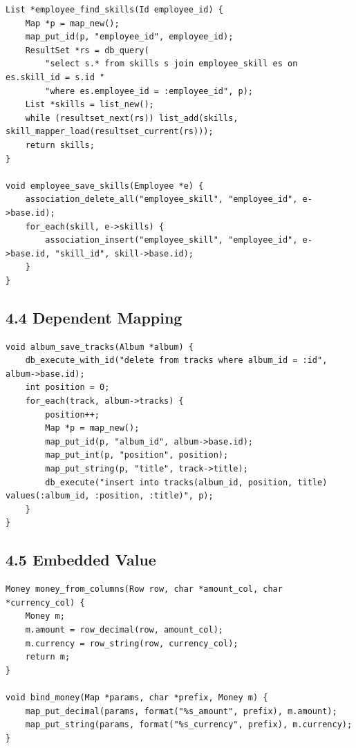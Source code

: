 \documentclass[11pt]{article}
\begin{document}
\begin{verbatim}
List *employee_find_skills(Id employee_id) {
    Map *p = map_new();
    map_put_id(p, "employee_id", employee_id);
    ResultSet *rs = db_query(
        "select s.* from skills s join employee_skill es on es.skill_id = s.id "
        "where es.employee_id = :employee_id", p);
    List *skills = list_new();
    while (resultset_next(rs)) list_add(skills, skill_mapper_load(resultset_current(rs)));
    return skills;
}

void employee_save_skills(Employee *e) {
    association_delete_all("employee_skill", "employee_id", e->base.id);
    for_each(skill, e->skills) {
        association_insert("employee_skill", "employee_id", e->base.id, "skill_id", skill->base.id);
    }
}
\end{verbatim}

\subsection{4.4 Dependent Mapping}\label{dependent-mapping}

\begin{verbatim}
void album_save_tracks(Album *album) {
    db_execute_with_id("delete from tracks where album_id = :id", album->base.id);
    int position = 0;
    for_each(track, album->tracks) {
        position++;
        Map *p = map_new();
        map_put_id(p, "album_id", album->base.id);
        map_put_int(p, "position", position);
        map_put_string(p, "title", track->title);
        db_execute("insert into tracks(album_id, position, title) values(:album_id, :position, :title)", p);
    }
}
\end{verbatim}

\subsection{4.5 Embedded Value}\label{embedded-value}

\begin{verbatim}
Money money_from_columns(Row row, char *amount_col, char *currency_col) {
    Money m;
    m.amount = row_decimal(row, amount_col);
    m.currency = row_string(row, currency_col);
    return m;
}

void bind_money(Map *params, char *prefix, Money m) {
    map_put_decimal(params, format("%s_amount", prefix), m.amount);
    map_put_string(params, format("%s_currency", prefix), m.currency);
}
\end{verbatim}
\end{document}
